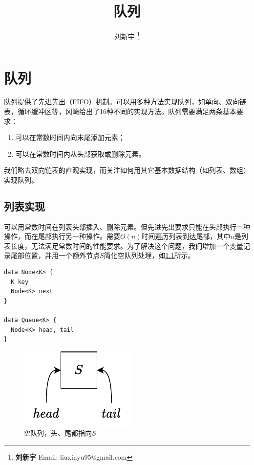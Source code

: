 \documentclass[b5paper]{ctexart}
\begin{document}
\title{队列}

\author{刘新宇
\thanks{{\bfseries 刘新宇 } \newline
  Email: liuxinyu95@gmail.com \newline}
  }

\maketitle
\fi


\ifx\wholebook\relax
\chapter{队列}
\fi

队列提供了先进先出（FIFO）机制。可以用多种方法实现队列，如单向、双向链表，循环缓冲区等，冈崎给出了16种不同的实现方法\cite{okasaki-book}。队列需要满足两条基本要求：

\begin{enumerate}
\item 可以在常数时间内向末尾添加元素；
\item 可以在常数时间内从头部获取或删除元素。
\end{enumerate}

我们略去双向链表的直观实现，而关注如何用其它基本数据结构（如列表、数组）实现队列。

\section{列表实现}

可以用常数时间在列表头部插入、删除元素。但先进先出要求只能在头部执行一种操作，而在尾部执行另一种操作。需要$O(n)$时间遍历列表到达尾部，其中$n$是列表长度，无法满足常数时间的性能要求。为了解决这个问题，我们增加一个变量记录尾部位置，并用一个额外节点$S$简化空队列处理，如\cref{fig:empty-list}所示。

\lstset{frame = single}
\begin{lstlisting}[language = Bourbaki]
data Node<K> {
  K key
  Node<K> next
}

data Queue<K> {
  Node<K> head, tail
}
\end{lstlisting}

\begin{figure}[htbp]
  \centering
  \includegraphics[scale=0.8]{img/empty-list}
  \caption{空队列，头、尾都指向$S$}
  \label{fig:empty-list}
\end{figure}
\end{document}
